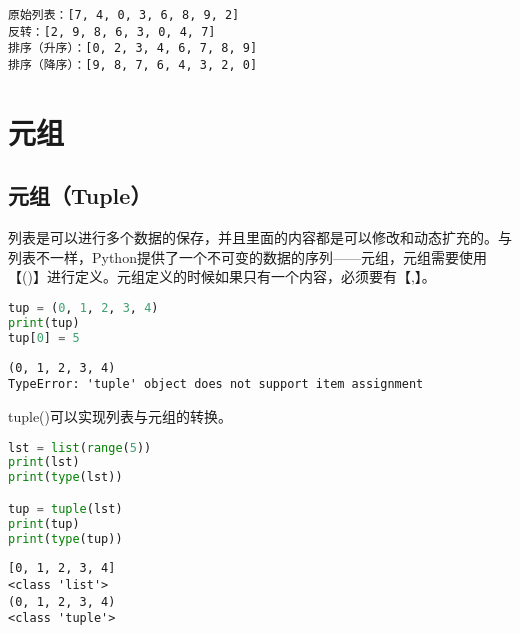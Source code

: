 \begin{tcolorbox}
	\begin{verbatim}
原始列表：[7, 4, 0, 3, 6, 8, 9, 2]
反转：[2, 9, 8, 6, 3, 0, 4, 7]
排序（升序）：[0, 2, 3, 4, 6, 7, 8, 9]
排序（降序）：[9, 8, 7, 6, 4, 3, 2, 0]
\end{verbatim}
\end{tcolorbox}

\newpage

\section{元组}

\subsection{元组（Tuple）}

列表是可以进行多个数据的保存，并且里面的内容都是可以修改和动态扩充的。与列表不一样，Python提供了一个不可变的数据的序列——元组，元组需要使用【()】进行定义。元组定义的时候如果只有一个内容，必须要有【,】。\\


\begin{lstlisting}[language=Python]
tup = (0, 1, 2, 3, 4)
print(tup)
tup[0] = 5
\end{lstlisting}

\begin{tcolorbox}
	\begin{verbatim}
(0, 1, 2, 3, 4)
TypeError: 'tuple' object does not support item assignment
\end{verbatim}
\end{tcolorbox}

tuple()可以实现列表与元组的转换。\\


\begin{lstlisting}[language=Python]
lst = list(range(5))
print(lst)
print(type(lst))

tup = tuple(lst)
print(tup)
print(type(tup))
\end{lstlisting}

\begin{tcolorbox}
	\begin{verbatim}
[0, 1, 2, 3, 4]
<class 'list'>
(0, 1, 2, 3, 4)
<class 'tuple'>
\end{verbatim}
\end{tcolorbox}

